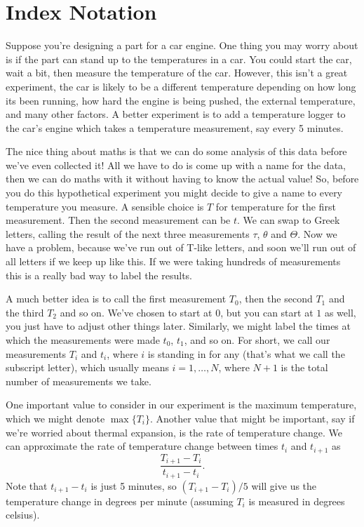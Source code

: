 \documentclass[fleqn]{LectureClass/LectureClass}
\begin{document}
    \section{Index Notation}
    Suppose you're designing a part for a car engine.
    One thing you may worry about is if the part can stand up to the temperatures in a car.
    You could start the car, wait a bit, then measure the temperature of the car.
    However, this isn't a great experiment, the car is likely to be a different temperature depending on how long its been running, how hard the engine is being pushed, the external temperature, and many other factors.
    A better experiment is to add a temperature logger to the car's engine which takes a temperature measurement, say every 5 minutes.
    
    The nice thing about maths is that we can do some analysis of this data before we've even collected it!
    All we have to do is come up with a name for the data, then we can do maths with it without having to know the actual value!
    So, before you do this hypothetical experiment you might decide to give a name to every temperature you measure.
    A sensible choice is \(T\) for temperature for the first measurement.
    Then the second measurement can be \(t\).
    We can swap to Greek letters, calling the result of the next three measurements \(\tau\), \(\theta\) and \(\Theta\).
    Now we have a problem, because we've run out of T-like letters, and soon we'll run out of all letters if we keep up like this.
    If we were taking hundreds of measurements this is a really bad way to label the results.
    
    A much better idea is to call the first measurement \(T_0\), then the second \(T_1\) and the third \(T_2\) and so on.
    We've chosen to start at \(0\), but you can start at \(1\) as well, you just have to adjust other things later.
    Similarly, we might label the times at which the measurements were made \(t_0\), \(t_1\), and so on.
    For short, we call our measurements \(T_i\) and \(t_i\), where \(i\) is standing in for any  (that's what we call the subscript letter), which usually means \(i = 1, \dotsc, N\), where \(N + 1\) is the total number of measurements we take.
    
    One important value to consider in our experiment is the maximum temperature, which we might denote \(\max\{T_i\}\).
    Another value that might be important, say if we're worried about thermal expansion, is the rate of temperature change.
    We can approximate the rate of temperature change between times \(t_i\) and \(t_{i+1}\) as
    \begin{equation}
        \frac{T_{i+1} - T_i}{t_{i+1} - t_i}.
    \end{equation}
    Note that \(t_{i+1} - t_i\) is just 5 minutes, so \((T_{i+1} - T_i)/5\) will give us the temperature change in degrees per minute (assuming \(T_i\) is measured in degrees celsius).
    
\end{document}
